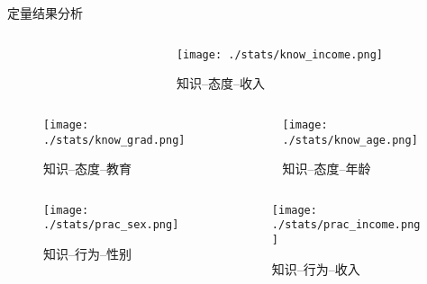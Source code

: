 \begin{frame}[allowframebreaks]{定量结果分析}
\begin{columns}
\begin{column}{0.5\textwidth}
\begin{figure}[h]
        \end{figure}
           
    \end{column}
    \begin{column}{0.5\textwidth}
        \begin{figure}[h]
            \caption{知识--态度--收入}
           \texttt{[image: ./stats/know\_income.png]}
           
       \end{figure}
    \end{column}
\end{columns}

    \begin{columns}
    \begin{column}{0.5\textwidth}
        \begin{figure}[h]
             \caption{知识--态度--教育}
            \texttt{[image: ./stats/know\_grad.png]}
           
        \end{figure}
        
    \end{column}
    \begin{column}{0.5\textwidth}
        \begin{figure}[h] 
            \caption{知识--态度--年龄}
            \texttt{[image: ./stats/know\_age.png]}
        \end{figure}
    \end{column}
\end{columns}

    \begin{columns}
    \begin{column}{0.5\textwidth}
        \begin{figure}[h]
            \caption{知识--行为--性别}
            \texttt{[image: ./stats/prac\_sex.png]}
            
        \end{figure}
        
    \end{column}
    \begin{column}{0.5\textwidth}
        \begin{figure}[h]
            \caption{知识--行为--收入}
            \texttt{[image: ./stats/prac\_income.png]}
            
        \end{figure}
    \end{column}
\end{columns}


\end{frame}

